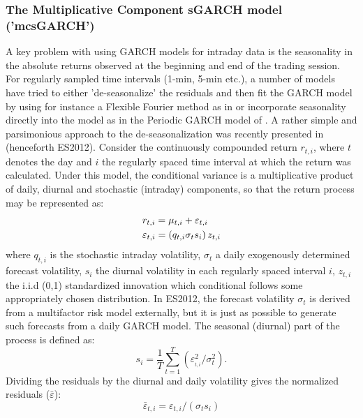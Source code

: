 \subsubsection{The Multiplicative Component sGARCH model ('mcsGARCH')}\label{section:mcsgarch}
A key problem with using GARCH models for intraday data is the seasonality in the absolute returns observed at the beginning and end of the trading session. For regularly sampled time intervals (1-min, 5-min etc.), a number of models have tried to either 'de-seasonalize' the residuals and then fit the GARCH model by using for instance a Flexible Fourier method as in \cite{Andersen1997} or incorporate seasonality directly into the model as in the Periodic GARCH model of \cite{Bollerslev1996}. A rather simple and parsimonious approach to the de-seasonalization was recently presented in \cite{Engle2012} (henceforth ES2012). Consider the continuously compounded return $r_{t,i}$, where $t$ denotes the day and $i$ the regularly spaced time interval at which the return was calculated. Under this model, the conditional variance is a multiplicative product of daily, diurnal and stochastic (intraday) components, so that the return process may be represented as:
\begin{equation}\label{mcs1}
\begin{gathered}
  {r_{t,i}} = {\mu _{t,i}} + {\varepsilon _{t,i}} \hfill \\
  {\varepsilon _{t,i}} = \left( {{q_{t,i}}{\sigma _t}{s_i}} \right){z_{t,i}} \hfill \\
\end{gathered}
\end{equation}
where $q_{t,i}$ is the stochastic intraday volatility, $\sigma_t$ a daily exogenously determined forecast volatility, $s_i$ the diurnal volatility in each regularly spaced interval $i$, $z_{t,i}$ the i.i.d (0,1) standardized innovation which conditional follows some appropriately chosen distribution. In ES2012, the forecast volatility $\sigma_t$ is derived from a multifactor risk model externally, but it is just as possible to generate such forecasts from a daily GARCH model. The seasonal (diurnal) part of the process is defined as:
\begin{equation}\label{mcs2}
{s_i} = \frac{1}{T}\sum\limits_{t = 1}^T {\left( {\varepsilon _{_{t,i}}^2/\sigma _t^2} \right)}.
\end{equation}
Dividing the residuals by the diurnal and daily volatility gives the normalized residuals ($\bar \varepsilon$):
\begin{equation}\label{mcs3}
{{\bar \varepsilon }_{t,i}} = {\varepsilon _{t,i}}/\left( {{\sigma _t}{s_i}} \right)
\end{equation}
